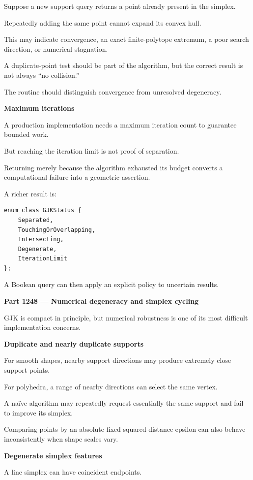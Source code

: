 Suppose a new support query returns a point already present in the simplex.

Repeatedly adding the same point cannot expand its convex hull.

This may indicate convergence, an exact finite-polytope extremum, a poor search direction, or numerical stagnation.

A duplicate-point test should be part of the algorithm, but the correct result is not always ``no collision.''

The routine should distinguish convergence from unresolved degeneracy.

\textbf{Maximum iterations}

A production implementation needs a maximum iteration count to guarantee bounded work.

But reaching the iteration limit is not proof of separation.

Returning  merely because the algorithm exhausted its budget converts a computational failure into a geometric assertion.

A richer result is:

\begin{verbatim}
enum class GJKStatus {
    Separated,
    TouchingOrOverlapping,
    Intersecting,
    Degenerate,
    IterationLimit
};
\end{verbatim}

A Boolean query can then apply an explicit policy to uncertain results.

\textbf{Part 1248 --- Numerical degeneracy and simplex cycling}

GJK is compact in principle, but numerical robustness is one of its most difficult implementation concerns.

\textbf{Duplicate and nearly duplicate supports}

For smooth shapes, nearby support directions may produce extremely close support points.

For polyhedra, a range of nearby directions can select the same vertex.

A naïve algorithm may repeatedly request essentially the same support and fail to improve its simplex.

Comparing points by an absolute fixed squared-distance epsilon can also behave inconsistently when shape scales vary.

\textbf{Degenerate simplex features}

A line simplex can have coincident endpoints.

